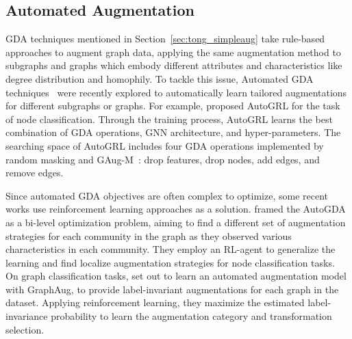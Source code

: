 \documentclass[11pt]{article}
\begin{document}
\subsection{Automated Augmentation}
\label{sec:tong_autoaug}
GDA techniques mentioned in Section~\ref{sec:tong_simpleaug} take rule-based approaches to augment graph data, applying the same augmentation method to subgraphs and graphs which embody different attributes and characteristics like degree distribution and homophily. To tackle this issue, Automated GDA techniques~\cite{sun2021automated, luo2022automated,zhao2022autogda,you2021graph, kose2022fair, hassani2022learning, zhu2021graph} were recently explored to automatically learn tailored augmentations for different subgraphs or graphs. For example, \citet{sun2021automated} proposed AutoGRL for the task of node classification. Through the training process, AutoGRL learns the best combination of GDA operations, GNN architecture, and hyper-parameters. The searching space of AutoGRL includes four GDA operations implemented by random masking and GAug-M~\cite{zhao2021data}: drop features, drop nodes, add edges, and remove edges.

Since automated GDA objectives are often complex to optimize, some recent works use reinforcement learning approaches as a solution. \citet{zhao2022autogda} framed the AutoGDA as a bi-level optimization problem, aiming to find a different set of augmentation strategies for each community in the graph as they observed various characteristics in each community. They employ an RL-agent to generalize the learning and find localize augmentation strategies for node classification tasks. On graph classification tasks, \citet{luo2022automated} set out to learn an automated augmentation model with GraphAug, to provide label-invariant augmentations for each graph in the dataset. Applying reinforcement learning, they maximize the estimated label-invariance probability to learn the augmentation category and transformation selection.
\end{document}
